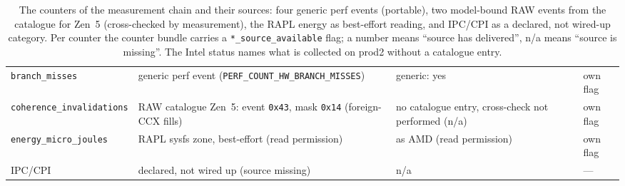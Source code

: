 \begin{nurkurz}
\begin{table}[htbp]
\begin{tabular}{@{}l>{\raggedright\arraybackslash}p{4.6cm}>{\raggedright\arraybackslash}p{3.2cm}>{\raggedright\arraybackslash}p{2.3cm}@{}}
\texttt{branch\_misses} & generic perf event (\texttt{PERF\_COUNT\_\allowbreak{}HW\_\allowbreak{}BRANCH\_\allowbreak{}MISSES}) & generic: yes & own flag \\
\texttt{coherence\_invalidations} & RAW catalogue Zen~5: event \texttt{0x43}, mask \texttt{0x14} (foreign-CCX fills) & no catalogue entry, cross-check not performed (n/a) & own flag \\ %
\texttt{energy\_micro\_joules} & RAPL sysfs zone, best-effort (read permission) & as AMD (read permission) & own flag \\
IPC/CPI & declared, not wired up (source missing) & n/a & --- \\
\bottomrule
\end{tabular}
\caption{The counters of the measurement chain and their sources: four generic perf events
(portable), two model-bound RAW events from the catalogue for Zen~5 (cross-checked by measurement),
the RAPL energy as best-effort reading, and IPC/CPI as a declared, not wired-up category. Per counter
the counter bundle carries a \texttt{*\_source\_available} flag; a number means \enquote{source has
delivered}, n/a means \enquote{source is missing}. The Intel status names what is collected on prod2
without a catalogue entry.}\label{tab:eval-pmc-zaehler}
\end{table}
\end{nurkurz}


